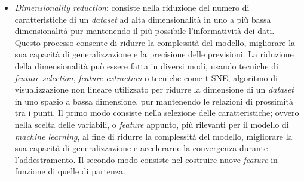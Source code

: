 \documentclass[12pt,italian]{report}
\begin{document}
\begin{itemize}
		\item \textit{Dimensionality reduction}: consiste nella riduzione del numero di caratteristiche di un \textit{dataset} ad alta dimensionalità in uno a più bassa dimensionalità pur mantenendo il più possibile l'informatività dei dati. Questo processo consente di ridurre la complessità del modello, migliorare la sua capacità di generalizzazione e la precisione delle previsioni.
		La riduzione della dimensionalità può essere fatta in diversi modi, usando tecniche di \textit{feature selection}, \textit{feature extraction} o tecniche come t-SNE, algoritmo di visualizzazione non lineare utilizzato per ridurre la dimensione di un \textit{dataset} in uno spazio a bassa dimensione, pur mantenendo le relazioni di prossimità tra i punti. Il primo modo consiste nella selezione delle caratteristiche; ovvero nella scelta delle variabili, o \textit{feature} appunto, più rilevanti per il modello di \textit{machine learning}, al fine di ridurre la complessità del modello, migliorare la sua capacità di generalizzazione e accelerarne la convergenza durante l'addestramento. Il secondo modo consiste nel costruire nuove \textit{feature} in funzione di quelle di partenza.
	\end{itemize}
	
	
\end{document}
